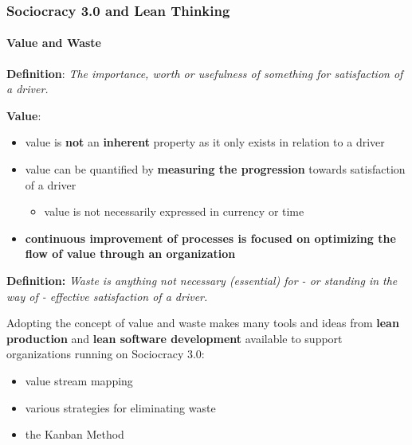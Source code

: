 \subsubsection{Sociocracy 3.0 and Lean Thinking}
\label{sociocracy3.0andleanthinking}

\paragraph{Value and Waste}
\label{valueandwaste}

\textbf{Definition}: \emph{The importance, worth or usefulness of something for satisfaction of a driver.}

\textbf{Value}:

\begin{itemize}
\item value is \textbf{not} an \textbf{inherent} property as it only exists in relation to a driver

\item value can be quantified by \textbf{measuring the progression} towards satisfaction of a driver

\begin{itemize}
\item value is not necessarily expressed in currency or time

\end{itemize}

\item \textbf{continuous improvement of processes is focused on optimizing the flow of value through an organization}

\end{itemize}

\textbf{Definition:} \emph{Waste is anything not necessary (essential) for - or standing in the way of - effective satisfaction of a driver.}

Adopting the concept of value and waste makes many tools and ideas from \textbf{lean production} and \textbf{lean software development} available to support organizations running on Sociocracy 3.0:

\begin{itemize}
\item value stream mapping

\item various strategies for eliminating waste

\item the Kanban Method

\end{itemize}

